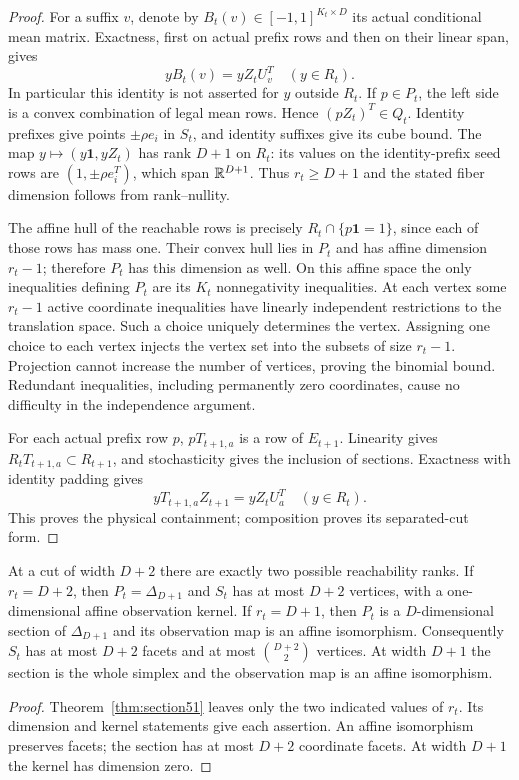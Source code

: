 \begin{proof}
For a suffix $v$, denote by $B_t(v)\in[-1,1]^{K_t\times D}$ its
actual conditional mean matrix. Exactness, first on actual prefix rows
and then on their linear span, gives
\begin{equation}\label{eq:span51}
 yB_t(v)=yZ_tU_v^T\quad(y\in R_t).
\end{equation}
In particular this identity is not asserted for $y$ outside $R_t$.
If $p\in P_t$, the left side is a convex combination of legal mean
rows. Hence $(pZ_t)^T\in Q_t$. Identity prefixes give points
$\pm\rho e_i$ in $S_t$, and identity suffixes give its cube bound.
The map $y\mapsto(y\mathbf1,yZ_t)$ has rank $D+1$ on $R_t$:
its values on the identity-prefix seed rows are $(1,\pm\rho e_i^T)$,
which span $\mathbb R^{D+1}$. Thus $r_t\ge D+1$ and the stated fiber
dimension follows from rank--nullity.

The affine hull of the reachable rows is precisely
$R_t\cap\{p\mathbf1=1\}$, since each of those rows has mass one.
Their convex hull lies in $P_t$ and has affine dimension $r_t-1$;
therefore $P_t$ has this dimension as well. On this affine space the
only inequalities defining $P_t$ are its $K_t$ nonnegativity
inequalities. At each vertex some $r_t-1$ active coordinate
inequalities have linearly independent restrictions to the translation
space. Such a choice uniquely determines the vertex. Assigning one
choice to each vertex injects the vertex set into the subsets of size
$r_t-1$. Projection cannot increase the number of vertices, proving
the binomial bound. Redundant inequalities, including permanently zero
coordinates, cause no difficulty in the independence argument.

For each actual prefix row $p$, $pT_{t+1,a}$ is a row of $E_{t+1}$.
Linearity gives $R_tT_{t+1,a}\subset R_{t+1}$, and stochasticity gives
the inclusion of sections. Exactness with identity padding gives
\[
 yT_{t+1,a}Z_{t+1}=yZ_tU_a^T\quad(y\in R_t).
\]
This proves the physical containment; composition proves its
separated-cut form.
\end{proof}

\begin{corollary}\label{cor:surplus51}
At a cut of width $D+2$ there are exactly two possible reachability
ranks. If $r_t=D+2$, then $P_t=\Delta_{D+1}$ and $S_t$ has at most
$D+2$ vertices, with a one-dimensional affine observation kernel.
If $r_t=D+1$, then $P_t$ is a $D$-dimensional section of
$\Delta_{D+1}$ and its observation map is an affine isomorphism.
Consequently $S_t$ has at most $D+2$ facets and at most
$\binom{D+2}{2}$ vertices. At width $D+1$ the section is the whole
simplex and the observation map is an affine isomorphism.
\end{corollary}
\begin{proof}
Theorem~\ref{thm:section51} leaves only the two indicated values of
$r_t$. Its dimension and kernel statements give each assertion. An
affine isomorphism preserves facets; the section has at most $D+2$
coordinate facets. At width $D+1$ the kernel has dimension zero.
\end{proof}

